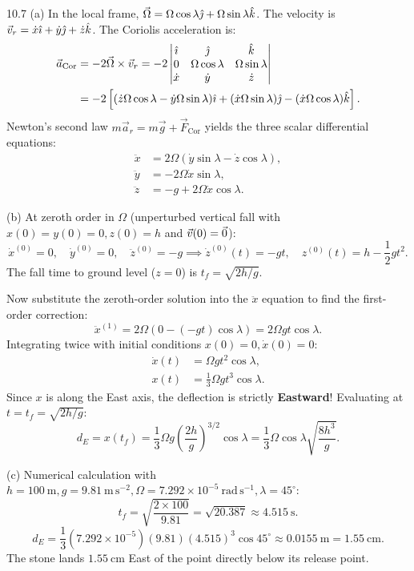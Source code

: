 \begin{solution}{10.7}
(a) In the local frame, $\vec{\Omega} = \Omega\cos\lambda\hat{\jmath} + \Omega\sin\lambda\hat{k}$.
The velocity is $\vec{v}_r = \dot{x}\hat{\imath} + \dot{y}\hat{\jmath} + \dot{z}\hat{k}$.
The Coriolis acceleration is:
\begin{align*}
\vec{a}_{\text{Cor}} &= -2\vec{\Omega}\times\vec{v}_r = -2\begin{vmatrix} \hat{\imath} & \hat{\jmath} & \hat{k} \\ 0 & \Omega\cos\lambda & \Omega\sin\lambda \\ \dot{x} & \dot{y} & \dot{z} \end{vmatrix} \\
&= -2\left[ (\dot{z}\Omega\cos\lambda - \dot{y}\Omega\sin\lambda)\hat{\imath} + (\dot{x}\Omega\sin\lambda)\hat{\jmath} - (\dot{x}\Omega\cos\lambda)\hat{k} \right].
\end{align*}
Newton's second law $m\vec{a}_r = m\vec{g} + \vec{F}_{\text{Cor}}$ yields the three scalar differential equations:
\begin{align*}
\ddot{x} &= 2\Omega(\dot{y}\sin\lambda - \dot{z}\cos\lambda), \\
\ddot{y} &= -2\Omega\dot{x}\sin\lambda, \\
\ddot{z} &= -g + 2\Omega\dot{x}\cos\lambda.
\end{align*}

(b) At zeroth order in $\Omega$ (unperturbed vertical fall with $x(0)=y(0)=0, z(0)=h$ and $\vec{v}(0)=\vec{0}$):
\[
\dot{x}^{(0)} = 0,\quad \dot{y}^{(0)} = 0,\quad \ddot{z}^{(0)} = -g \implies \dot{z}^{(0)}(t) = -gt,\quad z^{(0)}(t) = h - \frac{1}{2}gt^2.
\]
The fall time to ground level ($z=0$) is $t_f = \sqrt{2h/g}$.

Now substitute the zeroth-order solution into the $\ddot{x}$ equation to find the first-order correction:
\[
\ddot{x}^{(1)} = 2\Omega(0 - (-gt)\cos\lambda) = 2\Omega gt\cos\lambda.
\]
Integrating twice with initial conditions $x(0)=0, \dot{x}(0)=0$:
\begin{align*}
\dot{x}(t) &= \Omega gt^2\cos\lambda, \\
x(t) &= \frac{1}{3}\Omega gt^3\cos\lambda.
\end{align*}
Since $x$ is along the East axis, the deflection is strictly \textbf{Eastward}!
Evaluating at $t = t_f = \sqrt{2h/g}$:
\[
d_E = x(t_f) = \frac{1}{3}\Omega g \left(\frac{2h}{g}\right)^{3/2}\cos\lambda = \boxed{\frac{1}{3}\Omega\cos\lambda\sqrt{\frac{8h^3}{g}}.}
\]

(c) Numerical calculation with $h=100\ \mathrm{m}, g=9.81\ \mathrm{m\,s^{-2}}, \Omega=7.292\times 10^{-5}\ \mathrm{rad\,s^{-1}}, \lambda=45^\circ$:
\[
t_f = \sqrt{\frac{2\times 100}{9.81}} = \sqrt{20.387} \approx 4.515\ \mathrm{s}.
\]
\[
d_E = \frac{1}{3}(7.292\times 10^{-5})(9.81)(4.515)^3\cos 45^\circ \approx 0.0155\ \mathrm{m} = \mathbf{1.55\ \mathrm{cm}}.
\]
The stone lands $1.55\ \mathrm{cm}$ East of the point directly below its release point.
\end{solution}

